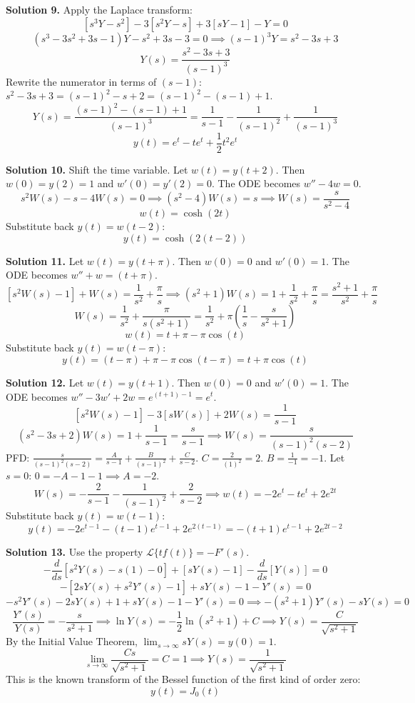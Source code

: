 \documentclass[11pt, letterpaper]{article}
\theoremstyle{definition}
\theoremstyle{remark}
\begin{document}
\vspace{1em}
\textbf{Solution 9.}
Apply the Laplace transform:
\[ [s^3 Y - s^2] - 3[s^2 Y - s] + 3[sY - 1] - Y = 0 \]
\[ (s^3 - 3s^2 + 3s - 1)Y - s^2 + 3s - 3 = 0 \implies (s - 1)^3 Y = s^2 - 3s + 3 \]
\[ Y(s) = \frac{s^2 - 3s + 3}{(s - 1)^3} \]
Rewrite the numerator in terms of $(s - 1)$: $s^2 - 3s + 3 = (s - 1)^2 - s + 2 = (s - 1)^2 - (s - 1) + 1$.
\[ Y(s) = \frac{(s - 1)^2 - (s - 1) + 1}{(s - 1)^3} = \frac{1}{s - 1} - \frac{1}{(s - 1)^2} + \frac{1}{(s - 1)^3} \]
\[ y(t) = e^t - t e^t + \frac{1}{2}t^2 e^t \]

\vspace{1em}
\textbf{Solution 10.}
Shift the time variable. Let $w(t) = y(t + 2)$. Then $w(0) = y(2) = 1$ and $w'(0) = y'(2) = 0$.
The ODE becomes $w'' - 4w = 0$.
\[ s^2 W(s) - s - 4W(s) = 0 \implies (s^2 - 4)W(s) = s \implies W(s) = \frac{s}{s^2 - 4} \]
\[ w(t) = \cosh(2t) \]
Substitute back $y(t) = w(t - 2)$:
\[ y(t) = \cosh(2(t - 2)) \]

\vspace{1em}
\textbf{Solution 11.}
Let $w(t) = y(t + \pi)$. Then $w(0) = 0$ and $w'(0) = 1$.
The ODE becomes $w'' + w = (t + \pi)$.
\[ [s^2 W(s) - 1] + W(s) = \frac{1}{s^2} + \frac{\pi}{s} \implies (s^2 + 1)W(s) = 1 + \frac{1}{s^2} + \frac{\pi}{s} = \frac{s^2 + 1}{s^2} + \frac{\pi}{s} \]
\[ W(s) = \frac{1}{s^2} + \frac{\pi}{s(s^2 + 1)} = \frac{1}{s^2} + \pi\left(\frac{1}{s} - \frac{s}{s^2 + 1}\right) \]
\[ w(t) = t + \pi - \pi\cos(t) \]
Substitute back $y(t) = w(t - \pi)$:
\[ y(t) = (t - \pi) + \pi - \pi\cos(t - \pi) = t + \pi\cos(t) \]

\vspace{1em}
\textbf{Solution 12.}
Let $w(t) = y(t + 1)$. Then $w(0) = 0$ and $w'(0) = 1$.
The ODE becomes $w'' - 3w' + 2w = e^{(t+1)-1} = e^t$.
\[ [s^2 W(s) - 1] - 3[sW(s)] + 2W(s) = \frac{1}{s - 1} \]
\[ (s^2 - 3s + 2)W(s) = 1 + \frac{1}{s - 1} = \frac{s}{s - 1} \implies W(s) = \frac{s}{(s - 1)^2(s - 2)} \]
PFD: $\frac{s}{(s - 1)^2(s - 2)} = \frac{A}{s - 1} + \frac{B}{(s - 1)^2} + \frac{C}{s - 2}$.
$C = \frac{2}{(1)^2} = 2$. $B = \frac{1}{-1} = -1$.
Let $s = 0$: $0 = -A - 1 - 1 \implies A = -2$.
\[ W(s) = -\frac{2}{s - 1} - \frac{1}{(s - 1)^2} + \frac{2}{s - 2} \implies w(t) = -2e^t - t e^t + 2e^{2t} \]
Substitute back $y(t) = w(t - 1)$:
\[ y(t) = -2e^{t-1} - (t - 1)e^{t-1} + 2e^{2(t-1)} = -(t + 1)e^{t-1} + 2e^{2t-2} \]

\vspace{1em}
\textbf{Solution 13.}
Use the property $\mathcal{L}\{t f(t)\} = -F'(s)$.
\[ -\frac{d}{ds}[s^2 Y(s) - s(1) - 0] + [sY(s) - 1] - \frac{d}{ds}[Y(s)] = 0 \]
\[ -[2sY(s) + s^2 Y'(s) - 1] + sY(s) - 1 - Y'(s) = 0 \]
\[ -s^2 Y'(s) - 2sY(s) + 1 + sY(s) - 1 - Y'(s) = 0 \implies -(s^2 + 1)Y'(s) - sY(s) = 0 \]
\[ \frac{Y'(s)}{Y(s)} = -\frac{s}{s^2 + 1} \implies \ln Y(s) = -\frac{1}{2}\ln(s^2 + 1) + C \implies Y(s) = \frac{C}{\sqrt{s^2 + 1}} \]
By the Initial Value Theorem, $\lim_{s \to \infty} sY(s) = y(0) = 1$.
\[ \lim_{s \to \infty} \frac{Cs}{\sqrt{s^2 + 1}} = C = 1 \implies Y(s) = \frac{1}{\sqrt{s^2 + 1}} \]
This is the known transform of the Bessel function of the first kind of order zero:
\[ y(t) = J_0(t) \]
\end{document}
